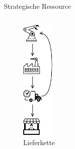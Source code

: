 \begin{frame}{Strategische Ressource {\footnotesize\cite{mollerIndustrialDataEcosystems2024}}}
\begin{columns}
        \begin{column}{0.3\textwidth}
            \begin{figure}
                \centering
                \includegraphics[height=6cm]{./assets/supply_chain.drawio.pdf}
                \caption{Lieferkette}
            \end{figure}
        \end{column}
    \end{columns}
\end{frame}



